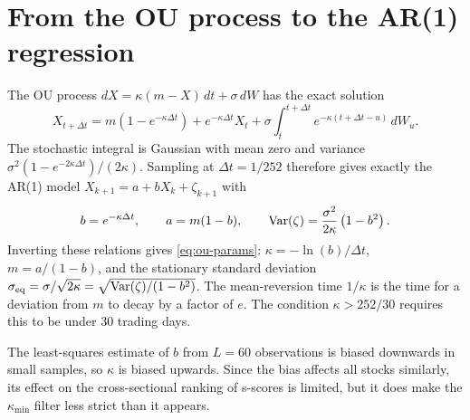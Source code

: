 \section{From the OU process to the AR(1) regression}
\label{app:ou}

The OU process $dX = \kappa(m - X)\,dt + \sigma\,dW$ has the exact solution
\begin{equation}
  X_{t+\Delta t} = m\left(1 - e^{-\kappa\Delta t}\right) + e^{-\kappa \Delta t} X_t
  + \sigma \int_t^{t+\Delta t} e^{-\kappa(t+\Delta t - u)}\, dW_u .
\end{equation}
The stochastic integral is Gaussian with mean zero and variance
$\sigma^2 (1 - e^{-2\kappa\Delta t})/(2\kappa)$. Sampling at $\Delta t = 1/252$ therefore gives
exactly the AR(1) model $X_{k+1} = a + bX_k + \zeta_{k+1}$ with
\begin{equation}
  b = e^{-\kappa\Delta t}, \qquad
  a = m(1-b), \qquad
  \operatorname{Var}(\zeta) = \frac{\sigma^2}{2\kappa}\left(1-b^2\right).
\end{equation}
Inverting these relations gives \cref{eq:ou-params}: $\kappa = -\ln(b)/\Delta t$,
$m = a/(1-b)$, and the stationary standard deviation
$\sigma_{\text{eq}} = \sigma/\sqrt{2\kappa} = \sqrt{\operatorname{Var}(\zeta)/(1-b^2)}$.
The mean-reversion time $1/\kappa$ is the time for a deviation from $m$ to decay by a factor of
$e$. The condition $\kappa > 252/30$ requires this to be under 30 trading days.

The least-squares estimate of $b$ from $L = 60$ observations is biased downwards in small samples,
so $\kappa$ is biased upwards. Since the bias affects all stocks similarly, its effect on the
cross-sectional ranking of s-scores is limited, but it does make the $\kappa_{\min}$ filter less
strict than it appears.
